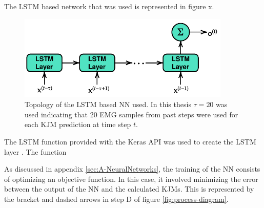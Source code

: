 \documentclass[../main.tex]{subfiles}
\begin{document}
The \ac{LSTM} based network that was used is represented in figure x.
\begin{figure}
    \centering
    \includegraphics[width=0.9\textwidth]{img/LSTM_model_used.pdf}
    \caption{Topology of the \ac{LSTM} based \ac{NN} used. In this thesis $\tau = 20$ was used indicating that 20 \ac{EMG} samples from past steps were used for each \ac{KJM} prediction at time step $t$.}
    \label{fig:lstm-model-used}
\end{figure}
The \ac{LSTM} function provided with the Keras API was used to create the \ac{LSTM} layer \cite{chollet2015keras}.
The function

As discussed in appendix \ref{sec:A-NeuralNetworks}, the training of the \ac{NN} consists of optimizing an objective function.
In this case, it involved minimizing the error between the output of the \ac{NN} and the calculated \acp{KJM}.
This is represented by the bracket and dashed arrows in step D of figure \ref{fig:process-diagram}.

\end{document}
